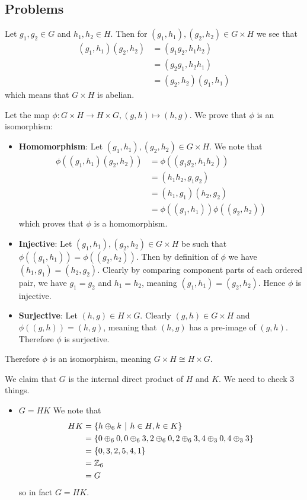 \subsection*{Problems}
\begin{questions}
    \item Let $g_1, g_2 \in G$ and $h_1, h_2 \in H$. Then for $(g_1, h_1), (g_2, h_2) \in G\times H$ we see that
    \begin{align*}
        (g_1, h_1)(g_2, h_2) &= (g_1g_2, h_1h_2)\\
        &= (g_2g_1, h_2h_1)\\
        &= (g_2,h_2)(g_1,h_1)
    \end{align*}
    which means that $G \times H$ is abelian.

    \item Let the map $\phi: G\times H \to H \times G, (g, h) \mapsto (h, g)$. We prove that $\phi$ is an isomorphism:
    \begin{itemize}
        \item \textbf{Homomorphism}: Let $(g_1, h_1), (g_2, h_2) \in G \times H$. We note that
        \begin{align*}
            \phi((g_1, h_1)(g_2, h_2)) &= \phi((g_1g_2, h_1h_2))\\
            &= (h_1h_2, g_1g_2)\\
            &= (h_1, g_1)(h_2, g_2)\\
            &= \phi((g_1, h_1))\phi((g_2, h_2))
        \end{align*}
        which proves that $\phi$ is a homomorphism.
        \item \textbf{Injective}: Let $(g_1, h_1), (g_2, h_2) \in G \times H$ be such that $\phi((g_1, h_1)) = \phi((g_2, h_2))$. Then by definition of $\phi$ we have $(h_1, g_1) = (h_2, g_2)$. Clearly by comparing component parts of each ordered pair, we have $g_1 = g_2$ and $h_1 = h_2$, meaning $(g_1, h_1) = (g_2, h_2)$. Hence $\phi$ is injective.
        \item \textbf{Surjective}: Let $(h, g) \in H \times G$. Clearly $(g, h) \in G \times H$ and $\phi((g, h)) = (h, g)$, meaning that $(h, g)$ has a pre-image of $(g, h)$. Therefore $\phi$ is surjective.
    \end{itemize}
    Therefore $\phi$ is an isomorphism, meaning $G \times H \cong H \times G$.

    \item We claim that $G$ is the internal direct product of $H$ and $K$. We need to check 3 things.
    \begin{itemize}
        \item $\boxed{G = HK}$ We note that
        \begin{align*}
            HK &= \{h \oplus_6 k \vert h \in H, k \in K\}\\
            &= \{0 \oplus_6 0, 0 \oplus_6 3, 2 \oplus_6 0, 2 \oplus_6 3, 4 \oplus_3 0, 4 \oplus_3 3\}\\
            &= \{0, 3, 2, 5, 4, 1\}\\
            &= \Z_6\\
            &= G
        \end{align*}
        so in fact $G = HK$.


\end{itemize}
\end{questions}
